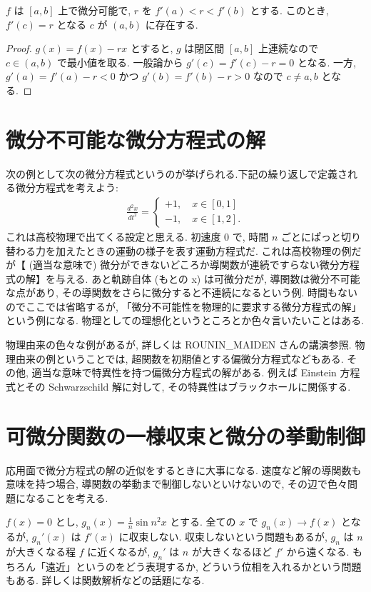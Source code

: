 \documentclass[openany, a4paper, oneside]{jsbook}
\theoremstyle{break}
\theoremstyle{breakdefn}
\begin{document}
$f$ は $[a, b]$ 上で微分可能で, $r$ を $f'(a) < r < f'(b)$ とする.
このとき, $f'(c) = r$ となる $c$ が $(a, b)$ に存在する.

\begin{proof}
 $g (x) = f (x) - rx$ とすると, $g$ は閉区間 $[a, b]$ 上連続なので $c \in (a, b)$ で最小値を取る.
 一般論から $g'(c) = f'(c) - r = 0$ となる.
 一方, $g'(a) = f'(a) - r < 0$ かつ $g'(b) = f'(b) - r > 0$ なので $c \neq a, b$ となる.
\end{proof}
\section{微分不可能な微分方程式の解}


次の例として次の微分方程式というのが挙げられる.下記の繰り返しで定義される微分方程式を考えよう:
\begin{align}
 \frac{d^2 x}{dt^2}
 =
 \begin{cases}
 +1, \quad x \in [0,1] \\
 -1, \quad x \in [1,2].
 \end{cases}
\end{align}
これは高校物理で出てくる設定と思える.
初速度 0 で, 時間 $n$ ごとにぱっと切り替わる力を加えたときの運動の様子を表す運動方程式だ.
これは高校物理の例だが【 (適当な意味で) 微分ができないどころか導関数が連続ですらない微分方程式の解】を与える.
あと軌跡自体 (もとの x) は可微分だが, 導関数は微分不可能な点があり, その導関数をさらに微分すると不連続になるという例.
時間もないのでここでは省略するが, 「微分不可能性を物理的に要求する微分方程式の解」という例になる.
物理としての理想化というところとか色々言いたいことはある.

物理由来の色々な例があるが, 詳しくは ROUNIN\_MAIDEN さんの講演参照.
物理由来の例ということでは, 超関数を初期値とする偏微分方程式などもある.
その他, 適当な意味で特異性を持つ偏微分方程式の解がある.
例えば Einstein 方程式とその Schwarzschild 解に対して, その特異性はブラックホールに関係する.
\section{可微分関数の一様収束と微分の挙動制御}


応用面で微分方程式の解の近似をするときに大事になる.
速度など解の導関数も意味を持つ場合, 導関数の挙動まで制御しないといけないので, その辺で色々問題になることを考える.

$f (x) = 0$ とし, $g_n (x) = \frac{1}{n} \sin n^2 x$ とする.
全ての $x$ で $g_n (x) \to f (x)$ となるが, $g_n'(x)$ は $f'(x)$ に収束しない.
収束しないという問題もあるが, $g_n$ は $n$ が大きくなる程 $f$ に近くなるが, $g_n'$ は $n$ が大きくなるほど $f'$ から遠くなる.
もちろん「遠近」というのをどう表現するか, どういう位相を入れるかという問題もある.
詳しくは関数解析などの話題になる.
\end{document}
